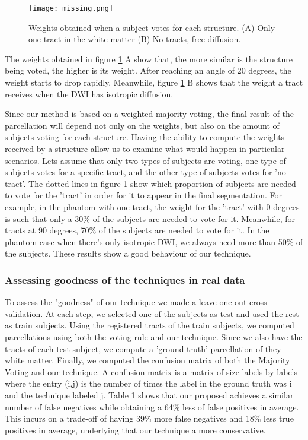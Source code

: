 \begin{figure}[h]
    \texttt{[image: missing.png]}
    \caption{Weights obtained when a subject votes for each structure.
             (A) Only one tract in the white matter (B) No tracts, free diffusion.}
    \label{fig:weight_exp_1}
\end{figure}

The weights obtained in figure \ref{fig:weight_exp_1} A show that, the more
similar is the structure being voted, the higher is its weight. After reaching
an angle of 20 degrees, the weight starts to drop rapidly. Meanwhile,
figure \ref{fig:weight_exp_1} B shows that the weight a tract receives when
the DWI has isotropic diffusion.

Since our method is based on a weighted majority voting, the final result of
the parcellation will depend not only on the weights, but also on the amount of
subjects voting for each structure.
Having the ability to compute the weights received by a structure allow us to
examine what would happen in particular scenarios. Lets assume that only two types
of subjects are voting, one type of subjects votes for a specific tract, and
the other type of subjects votes for 'no tract'. The dotted lines in figure
\ref{fig:weight_exp_1} show which proportion of subjects are needed to vote
for the 'tract' in order for it to appear in the final segmentation. For
example, in the phantom with one tract, the weight for the 'tract' with 0 degrees
is such that only a 30\% of the subjects are needed to vote for it. Meanwhile,
for tracts at 90 degrees, 70\% of the subjects are needed to vote for it. 
In the phantom case when there's only isotropic DWI, we always need more than
50\% of the subjects. These results show a good behaviour of our technique. 

\subsubsection{Assessing goodness of the techniques in real data}
To assess the "goodness" of our technique we made a leave-one-out
cross-validation. At each step, we selected one of the subjects as test and 
used the rest as train subjects. Using the registered tracts of the train
subjects, we computed parcellations using both the voting rule and our technique.
Since we also have the tracts of each test subject, we compute a 'ground truth'
parcellation of they white matter. Finally, we computed the confusion matrix of
both the Majority Voting and our technique. A confusion matrix is a matrix of 
size labels by labels where the entry (i,j) is the number of times the label in
the ground truth was i and the technique labeled j. Table 1 shows that our
proposed achieves a similar number of false negatives while obtaining a 64\%
less of false positives in average. This incurs on a trade-off of having 39\%
more false negatives and 18\% less true positives in average, underlying that
our technique a more conservative.\\

